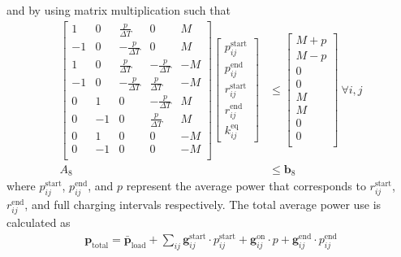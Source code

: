 and by using matrix multiplication such that
\begin{equation}\begin{aligned}
	\begin{bmatrix} 
		 1 &  0 &  \frac{p}{\Delta T} &  0                  &  M\\
		-1 &  0 & -\frac{p}{\Delta T} &  0                  &  M\\
		 1 &  0 &  \frac{p}{\Delta T} & -\frac{p}{\Delta T} & -M\\ 
		-1 &  0 & -\frac{p}{\Delta T} &  \frac{p}{\Delta T} & -M\\
		 0 &  1 & 0                   & -\frac{p}{\Delta T} &  M\\
		 0 & -1 & 0                   &  \frac{p}{\Delta T} &  M\\
		 0 &  1 & 0                   &  0                  & -M\\
		 0 & -1 & 0                   &  0                  & -M\\
	\end{bmatrix} 
	\begin{bmatrix}
		p_{ij}^{\text{start}} \\
                p_{ij}^{\text{end}} \\
                r_{ij}^{\text{start}} \\
                r_{ij}^{\text{end}} \\
                k_{ij}^{\text{eq}}
	\end{bmatrix} &\le 
	\begin{bmatrix}
		M + p \\
		M - p \\
		0 \\
		0 \\
		M \\
		M \\
		0 \\
		0 \\
	\end{bmatrix} \ \forall i,j \\
	A_8 &\le \mathbf{b}_8
\end{aligned}\end{equation} 
where $p_{ij}^{\text{start}}$, $p_{ij}^{\text{end}}$, and $p$ represent the average power that corresponds to $r_{ij}^{\text{start}}$, $r_{ij}^{\text{end}}$, and full charging intervals respectively. The total average power use is calculated as 
\begin{align}\label{eqn:totalPower}
	\mathbf{p}_{\text{total}} = \bar{\mathbf{p}}_{\text{load}} + \sum_{ij} \mathbf{g}^{\text{start}}_{ij}\cdot p^{\text{start}}_{ij} + \mathbf{g}^{\text{on}}_{ij}\cdot p + \mathbf{g}^{\text{end}}_{ij}\cdot p^{\text{end}}_{ij}
\end{align}
